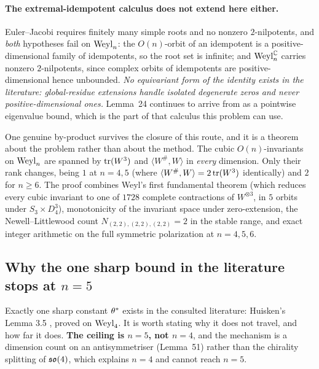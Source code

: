 \paragraph{The extremal-idempotent calculus does not extend here either.} Euler--Jacobi requires finitely many simple roots and no nonzero $2$-nilpotents, and \emph{both} hypotheses fail on $\mathrm{Weyl}_n$: the $O(n)$-orbit of an idempotent is a positive-dimensional family of idempotents, so the root set is infinite; and $\mathrm{Weyl}_n^{\mathbb C}$ carries nonzero $2$-nilpotents, since complex orbits of idempotents are positive-dimensional hence unbounded. \emph{No equivariant form of the identity exists in the literature: global-residue extensions handle isolated degenerate zeros and never positive-dimensional ones.} Lemma~24 continues to arrive from \cite{kt2018} as a pointwise eigenvalue bound, which is the part of that calculus this problem can use.

\begin{remarkstar}
One genuine by-product survives the closure of this route, and it is a theorem about the problem rather than about the method. The cubic $O(n)$-invariants on $\mathrm{Weyl}_n$ are spanned by $\operatorname{tr}(W^3)$ and $\langle W^{\#},W\rangle$ in \emph{every} dimension. Only their rank changes, being $1$ at $n=4,5$ (where $\langle W^{\#},W\rangle=2\operatorname{tr}(W^3)$ identically) and $2$ for $n\ge6$. The proof combines Weyl's first fundamental theorem (which reduces every cubic invariant to one of $1728$ complete contractions of $W^{\otimes3}$, in $5$ orbits under $S_3\times D_4^3$), monotonicity of the invariant space under zero-extension, the Newell--Littlewood count $N_{(2,2),(2,2),(2,2)}=2$ in the stable range, and exact integer arithmetic on the full symmetric polarization at $n=4,5,6$.
\end{remarkstar}

\subsection{Why the one sharp bound in the literature stops at \texorpdfstring{$n=5$}{n=5}}\label{sec:collapse}

Exactly one sharp constant $\theta^{*}$ exists in the consulted literature: Huisken's Lemma 3.5 \cite{huisken1985}, proved on $\mathrm{Weyl}_4$. It is worth stating why it does not travel, and how far it does. \textbf{The ceiling is $n=5$, not $n=4$}, and the mechanism is a dimension count on an antisymmetriser (Lemma~51) rather than the chirality splitting of $\mathfrak{so}(4)$, which explains $n=4$ and cannot reach $n=5$.

